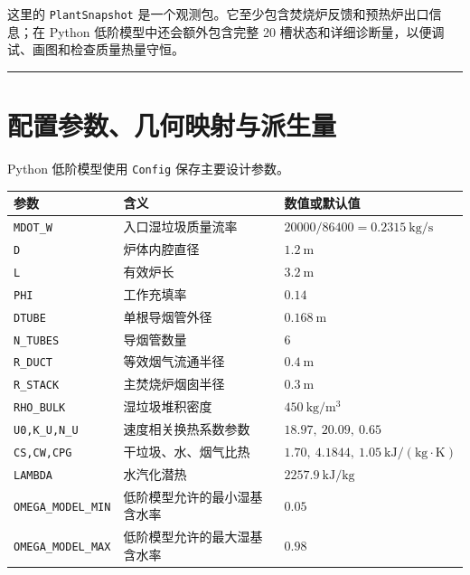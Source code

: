 \documentclass[UTF8,openany,zihao=-4,oneside]{ctexbook}
\providecommand{\passthrough}[1]{#1}
\newcommand{\manualdivider}{\par\vspace{0.6em}\noindent\textcolor{FGLine}{\rule{\linewidth}{0.7pt}}\vspace{0.6em}\par}
\begin{document}
这里的 \passthrough{\lstinline!PlantSnapshot!} 是一个观测包。它至少包含焚烧炉反馈和预热炉出口信息；在 Python 低阶模型中还会额外包含完整 20 槽状态和详细诊断量，以便调试、画图和检查质量热量守恒。

\manualdivider

\section{配置参数、几何映射与派生量}\label{ux914dux7f6eux53c2ux6570ux51e0ux4f55ux6620ux5c04ux4e0eux6d3eux751fux91cf}

Python 低阶模型使用 \passthrough{\lstinline!Config!} 保存主要设计参数。

\begin{longtable}[]{@{}
  >{\raggedright\arraybackslash}p{}
  >{\raggedright\arraybackslash}p{}
  >{\raggedright\arraybackslash}p{}@{}}
\toprule
参数 & 含义 & 数值或默认值 \\
\midrule
\endhead
\bottomrule
\endlastfoot
\passthrough{\lstinline!MDOT_W!} & 入口湿垃圾质量流率 & \(20000/86400=0.2315\ \mathrm{kg/s}\) \\
\passthrough{\lstinline!D!} & 炉体内腔直径 & \(1.2\ \mathrm{m}\) \\
\passthrough{\lstinline!L!} & 有效炉长 & \(3.2\ \mathrm{m}\) \\
\passthrough{\lstinline!PHI!} & 工作充填率 & \(0.14\) \\
\passthrough{\lstinline!DTUBE!} & 单根导烟管外径 & \(0.168\ \mathrm{m}\) \\
\passthrough{\lstinline!N_TUBES!} & 导烟管数量 & \(6\) \\
\passthrough{\lstinline!R_DUCT!} & 等效烟气流通半径 & \(0.4\ \mathrm{m}\) \\
\passthrough{\lstinline!R_STACK!} & 主焚烧炉烟囱半径 & \(0.3\ \mathrm{m}\) \\
\passthrough{\lstinline!RHO_BULK!} & 湿垃圾堆积密度 & \(450\ \mathrm{kg/m^3}\) \\
\passthrough{\lstinline!U0,K_U,N_U!} & 速度相关换热系数参数 & \(18.97,\ 20.09,\ 0.65\) \\
\passthrough{\lstinline!CS,CW,CPG!} & 干垃圾、水、烟气比热 & \(1.70,\ 4.1844,\ 1.05\ \mathrm{kJ/(kg\cdot K)}\) \\
\passthrough{\lstinline!LAMBDA!} & 水汽化潜热 & \(2257.9\ \mathrm{kJ/kg}\) \\
\passthrough{\lstinline!OMEGA_MODEL_MIN!} & 低阶模型允许的最小湿基含水率 & \(0.05\) \\
\passthrough{\lstinline!OMEGA_MODEL_MAX!} & 低阶模型允许的最大湿基含水率 & \(0.98\) \\
\end{longtable}
\end{document}

